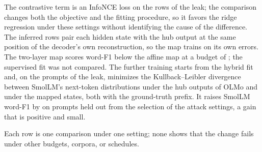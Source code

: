 The contrastive term is an InfoNCE loss on the rows of the leak; the comparison changes both the objective and the fitting procedure, so it favors the ridge regression under these settings without identifying the cause of the difference. %
The inferred rows pair each hidden state with the hub output at the same position of the decoder's own reconstruction, so the map trains on its own errors.
The two-layer map scores  word-F1 below the affine map at a budget of ; the supervised fit was not compared.
The further training starts from the hybrid fit and, on the prompts of the leak, minimizes the Kullback--Leibler divergence between SmolLM's next-token distributions under the hub outputs of OLMo and under the mapped states, both with the ground-truth prefix. %
It raises SmolLM word-F1 by  on prompts held out from the selection of the attack settings, a gain that is positive and small.

Each row is one comparison under one setting; none shows that the change fails under other budgets, corpora, or schedules.

